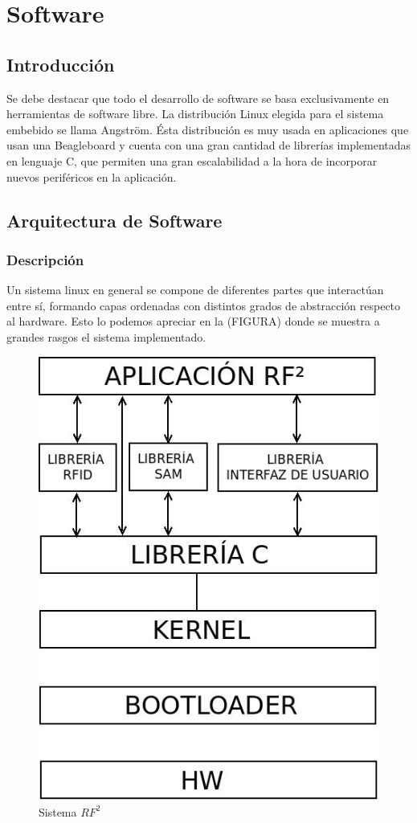 \chapter{Software}

\section{Introducción}
Se debe destacar que todo el desarrollo de software se basa exclusivamente en herramientas de software libre. La distribución Linux elegida para el sistema embebido se llama Angström. Ésta distribución es muy usada en aplicaciones que usan una Beagleboard y cuenta con una gran cantidad de librerías implementadas en lenguaje C, que permiten una gran escalabilidad a la hora de incorporar nuevos periféricos en la aplicación.

\section{Arquitectura de Software}
\subsection{Descripción}
Un sistema linux en general se compone de diferentes partes que interactúan entre sí, formando capas ordenadas con distintos grados de abstracción respecto al hardware. Esto lo podemos apreciar en la (FIGURA) donde se muestra a grandes rasgos el sistema implementado. 

\begin{figure}[H]
\centering
  \begin{center}
  \includegraphics[scale=.4]{Imagenes/SW.jpg} 
  \end{center}
  \caption{Sistema ${RF^{2}}$}\label{Fig:HW} 
\end{figure}

